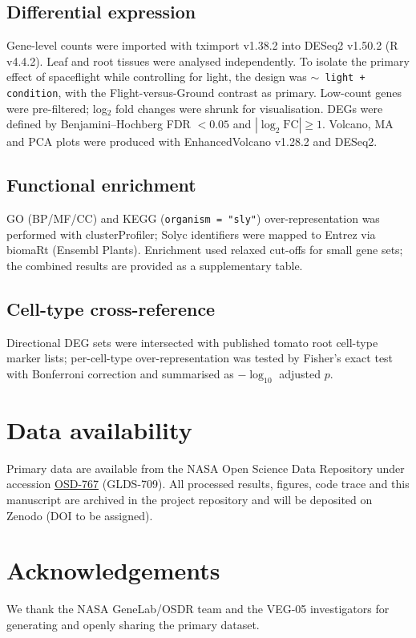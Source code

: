\documentclass[10pt,twocolumn]{article}
\begin{document}
\subsection{Differential expression}
Gene-level counts were imported with tximport v1.38.2 into DESeq2\cite{deseq2} v1.50.2 (R v4.4.2).
Leaf and root tissues were analysed independently. To isolate the primary effect of
spaceflight while controlling for light, the design was \texttt{$\sim$ light +
condition}, with the Flight-versus-Ground contrast as primary. Low-count genes were
pre-filtered; log$_2$ fold changes were shrunk for visualisation. DEGs were defined by
Benjamini--Hochberg FDR $<0.05$ and $|\log_2\text{FC}|\ge 1$. Volcano, MA and PCA plots
were produced with EnhancedVolcano v1.28.2 and DESeq2.

\subsection{Functional enrichment}
GO (BP/MF/CC) and KEGG (\texttt{organism = "sly"}) over-representation was performed
with clusterProfiler\cite{clusterprofiler}; Solyc identifiers were mapped to Entrez via
biomaRt (Ensembl Plants). Enrichment used relaxed cut-offs for small gene sets; the
combined results are provided as a supplementary table.

\subsection{Cell-type cross-reference}
Directional DEG sets were intersected with published tomato root cell-type marker
lists\cite{kajala2021}; per-cell-type over-representation was tested by Fisher's exact
test with Bonferroni correction and summarised as $-\log_{10}$ adjusted $p$.

\section*{Data availability}
Primary data are available from the NASA Open Science Data Repository under accession
\href{https://osdr.nasa.gov/bio/repo/data/studies/OSD-767}{OSD-767} (GLDS-709). All
processed results, figures, code trace and this manuscript are archived in the project
repository and will be deposited on Zenodo (DOI to be assigned).

\section*{Acknowledgements}
We thank the NASA GeneLab/OSDR team and the VEG-05 investigators for generating and
openly sharing the primary dataset.
\end{document}
